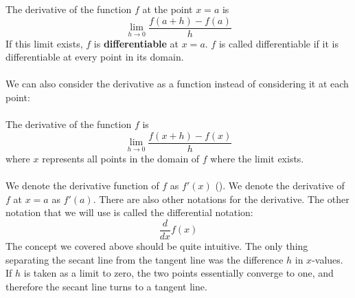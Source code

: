 \documentclass[11pt]{scrartcl}
\begin{document}
\noindent
The derivative of the function $f$ at the point $x=a$ is 
$$\lim_{h \to 0} \frac{f(a+h)-f(a)}{h}$$
If this limit exists, $f$ is \textbf{differentiable} at $x=a$. $f$ is called differentiable if it is differentiable at every point in its domain.\\
\\
\noindent
We can also consider the derivative as a function instead of considering it at each point: \\
\\
\noindent
The derivative of the function $f$ is 
$$\lim_{h \to 0} \frac{f(x+h)-f(x)}{h}$$
where $x$ represents all points in the domain of $f$ where the limit exists. \\
\\
\noindent 
We denote the derivative function of $f$ as $f'(x)$ (). We denote the derivative of $f$ at $x=a$ as $f'(a)$. There are also other notations for the derivative. The other notation that we will use is called the differential notation: 
$$\frac{d}{dx}f(x)$$
\noindent 
The concept we covered above should be quite intuitive. The only thing separating the secant line from the tangent line was the difference $h$ in $x$-values. If $h$ is taken as a limit to zero, the two points essentially converge to one, and therefore the secant line turns to a tangent line. 
\end{document}
